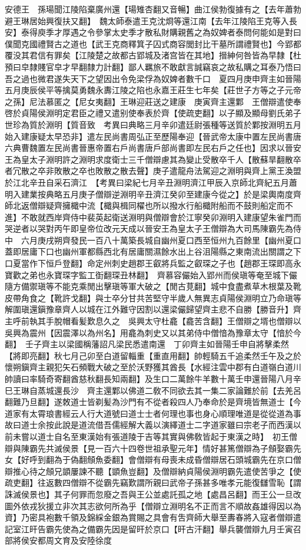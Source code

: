 安德王　孫瑒聞江陵陷棄廣州還【瑒雉杏翻又音暢】曲江侯勃復據有之【去年蕭勃避王琳居始興復扶又翻】　魏太師泰遣王克沈烱等還江南【去年江陵陷王克等入長安】泰得庾季才厚遇之令參掌太史季才散私財購親舊之為奴婢者泰問何能如是對曰僕聞克國禮賢古之道也【武王克商釋箕子囚式商容閭封比干墓所謂禮賢也】今郢都覆没其君信有罪矣【江陵楚之故都古郢城及渚宫皆在其地】搢紳何咎皆為早隸【杜預曰皁隸賤官皁才早翻隸力計翻】鄙人羈旅不敢獻言誠竊哀之故私購之耳泰乃悟曰吾之過也微君遂失天下之望因出令免梁俘為奴婢者數千口　夏四月庚申齊主如晉陽　五月庚辰侯平等擒莫勇魏永夀江陵之陷也永嘉王莊生七年矣【莊世子方等之子元帝之孫】尼法慕匿之【尼女夷翻】王琳迎莊送之建康　庚寅齊主還鄴　王僧辯遣使奉啓於貞陽侯淵明定君臣之禮又遣别使奉表於齊【使疏吏翻】以子顯及顯母劉氏弟子世珍為質於淵明【質音致　考異曰典略三月辛卯遣廷尉張種等送質於鄴按淵明五月始入建康疑太早恐非】遣左民尚書周弘正至歷陽奉迎【晉武帝太康中置左民尚書唐六典曹魏置左民尚書晉惠帝置右戶尚書唐戶部尚書即左民右戶之任也】因求以晉安王為皇太子淵明許之淵明求度衛士三千僧辯慮其為變止受散卒千人【散蘇旱翻散卒者冗散之卒非敗散之卒也敗散之散去聲】庚子遣龍舟法駕迎之淵明與齊上黨王渙盟於江北辛丑自采石濟江　【考異曰梁紀七月辛丑淵明濟江甲辰入京師北齊紀五月蕭明入建業按典略五月庚子僧辯逆淵明辛丑濟江癸卯至建康今從之】於是梁輿南度齊師北返僧辯疑齊擁檝中流【檝與楫同櫂也所以撥水行船檝附船而不鼓則船定而不進】不敢就西岸齊侍中裴英起衛送淵明與僧辯會於江寧癸卯淵明入建康望朱雀門而哭逆者以哭對丙午即皇帝位改元天成以晉安王為皇太子王僧辯為大司馬陳霸先為侍中　六月庚戌朔齊發民一百八十萬築長城自幽州夏口西至恒州九百餘里【幽州夏口蓋即居庸下口也幽州軍都縣西北有居庸關濕餘水出上谷沮陽縣之東南流出關謂之下口夏當作下恒戶登翻】命定州刺史趙郡王叡將兵監之叡琛之子也【趙郡王琛即高永寶歡之弟也永寶琛字監工衘翻琛丑林翻】　齊慕容儼始入郢州而侯瑱等奄至城下儼隨方備禦瑱等不能克乘閒出擊瑱等軍大破之【閒古莧翻】城中食盡煮草木根葉及靴皮帶角食之【靴許戈翻】與士卒分甘共苦堅守半歲人無異志貞陽侯淵明立乃命瑱等解圍瑱還鎭豫章齊人以城在江外難守因割以還梁儼歸望齊主悲不自勝【勝音升】齊主呼前執其手脫帽看髪歎息久之　吳興太守杜龕【龕苦含翻】王僧辯之壻也僧辯以吳興為震州【因震澤以為州名】用龕為刺史又以其弟侍中僧愔為豫章太守【愔於今翻】　壬子齊主以梁國稱藩詔凡梁民悉遣南還　丁卯齊主如晉陽壬申自將擊柔然【將即亮翻】秋七月己卯至白道留輜重【重直用翻】帥輕騎五千追柔然壬午及之於懷朔鎭齊主親犯矢石頻戰大破之至於沃野獲其酋長【水經注雲中郡有白道嶺白道川帥讀曰率騎奇寄翻酋慈秋翻長知兩翻】及生口二萬餘牛羊數十萬壬申還晉陽八月辛巳王琳自蒸城還長沙　齊主還鄴以佛道二敎不同欲去其一集二家論難於前【去羌呂翻難乃旦翻】遂敇道士皆剃髪為沙門有不從者殺四人乃奉命於是齊境皆無道士【今道家有太霄琅書經云人行大道號曰道士士者何理也事也身心順理唯道是從從道為事故曰道士余按此說是道流借吾儒經解大義以演繹道士二字道家雖曰宗老子而西漢以前未嘗以道士自名至東漢始有張道陵于吉等其實與佛敎皆起于東漢之時】　初王僧辯與陳霸先共滅侯景【見一百六十四卷世祖承聖元年】情好甚篤僧辯為子頠娶霸先女【好呼到翻為于偽翻頠魚委翻】會僧辯有母喪未成昏僧辯居石頭城霸先在京口僧辯推心待之頠兄顗屢諫不聽【顗魚豈翻】及僧辯納貞陽侯淵明霸先遣使苦爭之【使疏吏翻】往返數四僧辯不從霸先竊歎謂所親曰武帝子孫甚多唯孝元能復讎雪恥【謂誅滅侯景也】其子何罪而忽廢之吾與王公並處託孤之地【處昌呂翻】而王公一旦改圖外依戎狄援立非次其志欲何所為乎【僧辯立淵明名不正而言不順故姦雄得因以為資】乃密具袍數千領及錦綵金銀為賞賜之具會有吿齊師大舉至夀春將入寇者僧辯遣記室江旰告霸先使為之備霸先因是留旰於京口【旰古汗翻】舉兵襲僧辯九月壬寅召部將侯安都周文育及安陸徐度